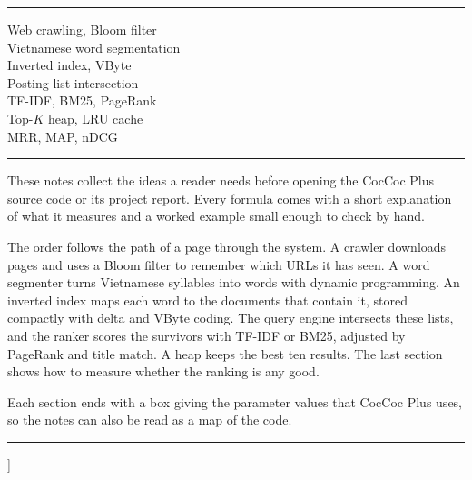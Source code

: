 \documentclass[9pt,twocolumn,a4paper]{extarticle}
\newcommand{\spaced}[1]{\textls[160]{#1}}
\begin{document}
{\begin{@twocolumnfalse}
\noindent\begin{minipage}[t]{0.255\textwidth}
{\footnotesize\spaced{K E Y W O R D S}\par}
\vspace{2pt}\noindent\rule{\linewidth}{0.4pt}\par\vspace{3pt}
{\scriptsize
Web crawling, Bloom filter\\
Vietnamese word segmentation\\
Inverted index, VByte\\
Posting list intersection\\
TF-IDF, BM25, PageRank\\
Top-$K$ heap, LRU cache\\
MRR, MAP, nDCG\par}
\end{minipage}\hfill
\begin{minipage}[t]{0.715\textwidth}
{\footnotesize\spaced{A B S T R A C T}\par}
\vspace{2pt}\noindent\rule{\linewidth}{0.4pt}\par\vspace{3pt}
{\scriptsize\setlength{\parindent}{0pt}\linespread{1.08}\selectfont
These notes collect the ideas a reader needs before opening the CocCoc Plus source code or its project report. Every formula comes with a short explanation of what it measures and a worked example small enough to check by hand.

The order follows the path of a page through the system. A crawler downloads pages and uses a Bloom filter to remember which URLs it has seen. A word segmenter turns Vietnamese syllables into words with dynamic programming. An inverted index maps each word to the documents that contain it, stored compactly with delta and VByte coding. The query engine intersects these lists, and the ranker scores the survivors with TF-IDF or BM25, adjusted by PageRank and title match. A heap keeps the best ten results. The last section shows how to measure whether the ranking is any good.

Each section ends with a box giving the parameter values that CocCoc Plus uses, so the notes can also be read as a map of the code.\par}
\end{minipage}

\vspace{0.25cm}
\noindent\rule{\textwidth}{0.4pt}
\vspace{0.35cm}
\end{@twocolumnfalse}
}]
\end{document}
